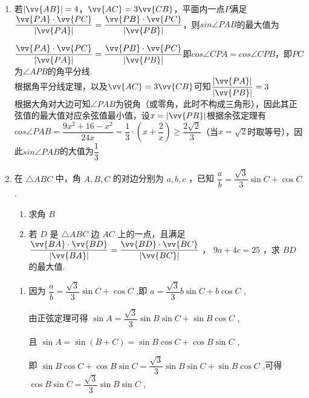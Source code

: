 \begin{enumerate}
\begin{enumerate}
        \item 若$|\vv{AB}| = 4$，$\vv{AC} = 3\vv{CB}$，平面内一点$P$满足$\dfrac{\vv{PA} \cdot \vv{PC}}{|\vv{PA}|} = \dfrac{\vv{PB} \cdot \vv{PC}}{|\vv{PB}|}$，则$sin\angle PAB$的最大值为
        \begin{jieda}
            $\dfrac{\vv{PA} \cdot \vv{PC}}{|\vv{PA}|} = \dfrac{\vv{PB} \cdot \vv{PC}}{|\vv{PB}|}$即$cos\angle CPA = cos\angle CPB$，即$PC$为$\angle APB$的角平分线. \\
            根据角平分线定理，以及$\vv{AC} = 3\vv{CB}$可知$\dfrac{|\vv{PA}|}{|\vv{PB}|} = 3$ \\
            根据大角对大边可知$\angle PAB$为锐角（或零角，此时不构成三角形），因此其正弦值的最大值对应余弦值最小值，设$x = |\vv{PB}|$根据余弦定理有$cos\angle PAB = \dfrac{9x^2 + 16 - x^2}{24x} = \dfrac{1}{3} \cdot \left(x + \dfrac{2}{x}\right) \geq \dfrac{2\sqrt{2}}{3}$（当$x = \sqrt{2}$时取等号），因此$sin\angle PAB$的大值为$\dfrac{1}{3}$
        \end{jieda}
        
        \item 在 $\bigtriangleup  {ABC}$ 中，角 $A,B,C$ 的对边分别为 $a,b,c$ ，已知 $\dfrac{a}{b} = \dfrac{\sqrt{3}}{3}\sin C + \cos C$ .
        \begin{enumerate}
            \item 求角 $B$
            \item 若 $D$ 是 $\bigtriangleup  {ABC}$ 边 ${AC}$ 上的一点，且满足 $\dfrac{\vv{BA} \cdot  \vv{BD}}{\left| \vv{BA}\right| } = \dfrac{\vv{BD} \cdot  \vv{BC}}{\left| \vv{BC}\right| }$ ， ${9a} + {4c} = {25}$ ，求 ${BD}$ 的最大值.
        \end{enumerate}
        \begin{jieda}
            \begin{enumerate}
                \item 因为 $\dfrac{a}{b} = \dfrac{\sqrt{3}}{3}\sin C + \cos C$ ,即 $a = \dfrac{\sqrt{3}}{3}b\sin C + b\cos C$ ,
                
                由正弦定理可得 $\sin A = \dfrac{\sqrt{3}}{3}\sin B\sin C + \sin B\cos C$ ,
                
                且 $\sin A = \sin \left( {B + C}\right)  = \sin B\cos C + \cos B\sin C$ ,
                
                即 $\sin B\cos C + \cos B\sin C = \dfrac{\sqrt{3}}{3}\sin B\sin C + \sin B\cos C$ ,可得 $\cos B\sin C = \dfrac{\sqrt{3}}{3}\sin B\sin C$ ,
                

\end{enumerate}
\end{jieda}
\end{enumerate}
\end{enumerate}
